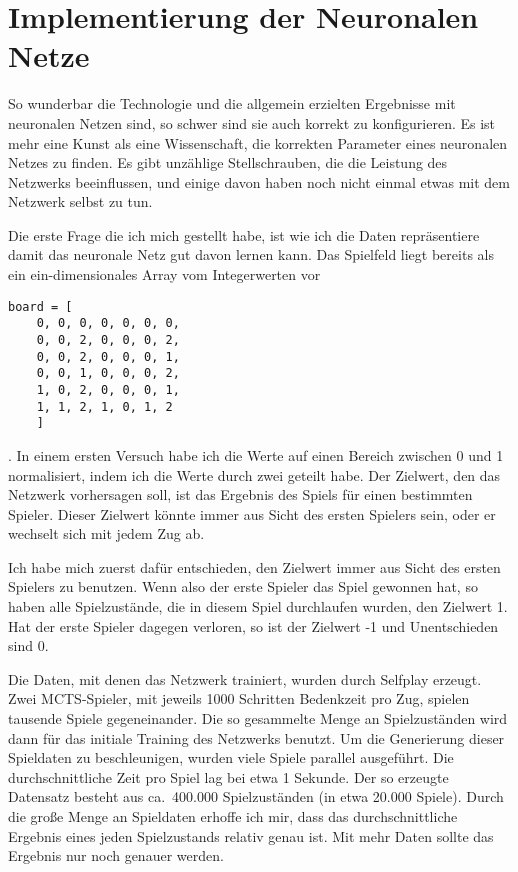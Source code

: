 \section{Implementierung der Neuronalen Netze}
\label{chap:nn-impl}

So wunderbar die Technologie und die allgemein erzielten Ergebnisse mit neuronalen Netzen sind, so schwer sind sie auch korrekt zu konfigurieren.
Es ist mehr eine Kunst als eine Wissenschaft, die korrekten Parameter eines neuronalen Netzes zu finden.
Es gibt unzählige Stellschrauben, die die Leistung des Netzwerks beeinflussen, und einige davon haben noch nicht einmal etwas mit dem Netzwerk selbst zu tun.

Die erste Frage die ich mich gestellt habe, ist wie ich die Daten repräsentiere damit das neuronale Netz gut davon lernen kann.
Das Spielfeld liegt bereits als ein ein-dimensionales Array vom Integerwerten vor
\begin{verbatim}
board = [
    0, 0, 0, 0, 0, 0, 0,
    0, 0, 2, 0, 0, 0, 2,
    0, 0, 2, 0, 0, 0, 1,
    0, 0, 1, 0, 0, 0, 2,
    1, 0, 2, 0, 0, 0, 1,
    1, 1, 2, 1, 0, 1, 2
    ]
\end{verbatim}
.
In einem ersten Versuch habe ich die Werte auf einen Bereich zwischen 0 und 1 normalisiert, indem ich die Werte durch zwei geteilt habe.
Der Zielwert, den das Netzwerk vorhersagen soll, ist das Ergebnis des Spiels für einen bestimmten Spieler.
Dieser Zielwert könnte immer aus Sicht des ersten Spielers sein, oder er wechselt sich mit jedem Zug ab.

Ich habe mich zuerst dafür entschieden, den Zielwert immer aus Sicht des ersten Spielers zu benutzen.
Wenn also der erste Spieler das Spiel gewonnen hat, so haben alle Spielzustände, die in diesem Spiel durchlaufen wurden, den Zielwert 1.
Hat der erste Spieler dagegen verloren, so ist der Zielwert -1 und Unentschieden sind 0.

Die Daten, mit denen das Netzwerk trainiert, wurden durch Selfplay erzeugt.
Zwei MCTS-Spieler, mit jeweils 1000 Schritten Bedenkzeit pro Zug, spielen tausende Spiele gegeneinander.
Die so gesammelte Menge an Spielzuständen wird dann für das initiale Training des Netzwerks benutzt.
Um die Generierung dieser Spieldaten zu beschleunigen, wurden viele Spiele parallel ausgeführt.
Die durchschnittliche Zeit pro Spiel lag bei etwa 1 Sekunde.
Der so erzeugte Datensatz besteht aus ca.\ 400.000 Spielzuständen (in etwa 20.000 Spiele).
Durch die große Menge an Spieldaten erhoffe ich mir, dass das durchschnittliche Ergebnis eines jeden Spielzustands relativ genau ist.
Mit mehr Daten sollte das Ergebnis nur noch genauer werden.


